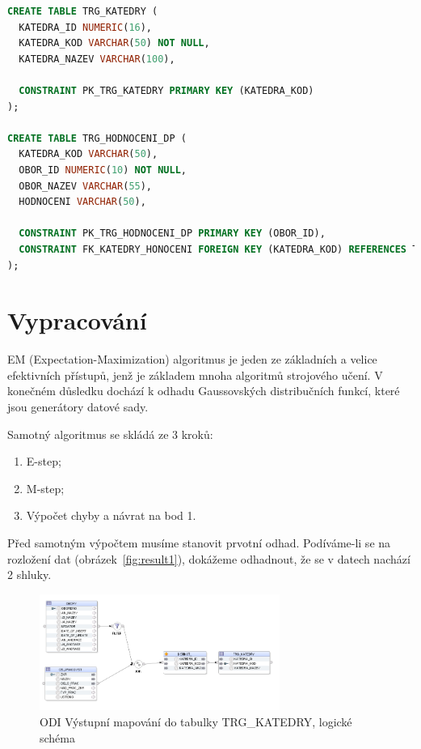 \begin{lstlisting}[language=sql]
CREATE TABLE TRG_KATEDRY (
  KATEDRA_ID NUMERIC(16),
  KATEDRA_KOD VARCHAR(50) NOT NULL,
  KATEDRA_NAZEV VARCHAR(100),

  CONSTRAINT PK_TRG_KATEDRY PRIMARY KEY (KATEDRA_KOD)
);

CREATE TABLE TRG_HODNOCENI_DP (
  KATEDRA_KOD VARCHAR(50),
  OBOR_ID NUMERIC(10) NOT NULL,
  OBOR_NAZEV VARCHAR(55),
  HODNOCENI VARCHAR(50),

  CONSTRAINT PK_TRG_HODNOCENI_DP PRIMARY KEY (OBOR_ID),
  CONSTRAINT FK_KATEDRY_HONOCENI FOREIGN KEY (KATEDRA_KOD) REFERENCES TRG_KATEDRY (KATEDRA_KOD)
);

\end{lstlisting}

\section{Vypracování}

EM (Expectation-Maximization) algoritmus je jeden ze základních a velice efektivních přístupů, jenž je základem mnoha algoritmů strojového učení.
V konečném důsledku dochází k odhadu Gaussovských distribučních funkcí, které jsou generátory datové sady.

Samotný algoritmus se skládá ze 3 kroků:

\begin{enumerate}
    \item E-step;
    \item M-step;
    \item Výpočet chyby a návrat na bod 1.
\end{enumerate}

Před samotným výpočtem musíme stanovit prvotní odhad.
Podíváme-li se na rozložení dat (obrázek~\ref{fig:result1}), dokážeme odhadnout, že se v datech nachází 2 shluky.

\begin{figure}[htb]
    \centering
    \includegraphics[width=0.7\textwidth]{graphs/odi-mapping-trg-katedry.png}
    \caption{ODI Výstupní mapování do tabulky TRG\_KATEDRY, logické schéma}
    \label{fig:odi-mapping-trg-katedry}
\end{figure}
\FloatBarrier

